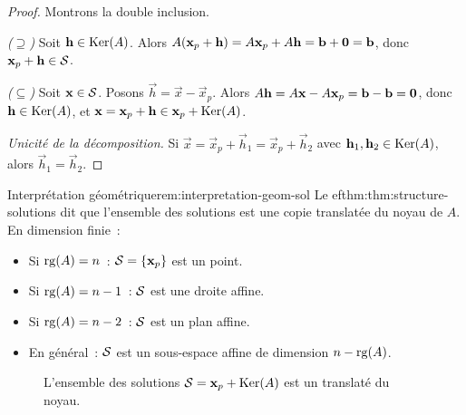 \begin{proof}
  Montrons la double inclusion.

  \emph{($\supseteq$)} Soit $\mathbf{h}\in\operatorname{Ker}(A)$. Alors
  $A(\mathbf{x}_p+\mathbf{h})=A\mathbf{x}_p+A\mathbf{h}=\mathbf{b}+\mathbf{0}=\mathbf{b}$,
  donc $\mathbf{x}_p+\mathbf{h}\in{\mathcal{S}}$.

  \emph{($\subseteq$)} Soit $\mathbf{x}\in{\mathcal{S}}$. Posons
  $\vec{h}=\vec{x}-\vec{x}_p$. Alors
  $A\mathbf{h}=A\mathbf{x}-A\mathbf{x}_p=\mathbf{b}-\mathbf{b}=\mathbf{0}$, donc
  $\mathbf{h}\in\operatorname{Ker}(A)$, et $\mathbf{x}=\mathbf{x}_p+\mathbf{h}\in\mathbf{x}_p+\operatorname{Ker}(A)$.

  \emph{Unicité de la décomposition.} Si $\vec{x}=\vec{x}_p+\vec{h}_1=
  \vec{x}_p+\vec{h}_2$ avec $\mathbf{h}_1,\mathbf{h}_2\in\operatorname{Ker}(A)$, alors
  $\vec{h}_1=\vec{h}_2$.
\end{proof}

\begin{remark}{Interprétation géométrique}{rem:interpretation-geom-sol}
  Le 
ef{thm:thm:structure-solutions} dit que l'ensemble des solutions
  est une \og copie translatée\fg{} du noyau de $A$. En dimension finie~:
  \begin{itemize}
    \item Si $\operatorname{rg}(A)=n$~: ${\mathcal{S}}=\left\{\mathbf{x}_p\right\}$ est un point.
    \item Si $\operatorname{rg}(A)=n-1$~: ${\mathcal{S}}$ est une droite affine.
    \item Si $\operatorname{rg}(A)=n-2$~: ${\mathcal{S}}$ est un plan affine.
    \item En général~: ${\mathcal{S}}$ est un sous-espace affine de dimension
      $n-\operatorname{rg}(A)$.
  \end{itemize}
\end{remark}

\begin{figure}[ht]
\centering
{}
\caption{L'ensemble des solutions ${\mathcal{S}}=\mathbf{x}_p+\operatorname{Ker}(A)$ est un translaté du noyau.}
\label{fig:structure-solutions}
\end{figure}

